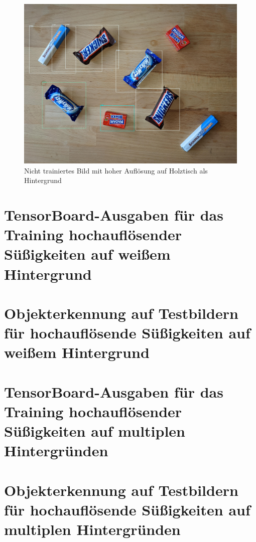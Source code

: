     \begin{figure}[H]
        \centering
        \includegraphics[angle = 90, width = \textwidth]{Bilder/models/model_comparison/ssd_resnet101_v1_fpn_640x640_coco17_tpu-8/HD_on_wood.jpg}
        \caption{Nicht trainiertes Bild mit hoher Auflösung auf Holztisch als Hintergrund}
    \end{figure}
    
    
    \section{TensorBoard-Ausgaben für das Training hochauflösender Süßigkeiten auf weißem Hintergrund}
    \label{app: TensorBoard-Ausgaben für das Training hochauflösender Süßigkeiten auf weißem Hintergrund}
    
    
    
    \section{Objekterkennung auf Testbildern für hochauflösende Süßigkeiten auf weißem Hintergrund}
    \label{app: Objekterkennung auf Testbildern für hochauflösende Süßigkeiten auf weißem Hintergrund}
    
    
    
    \section{TensorBoard-Ausgaben für das Training hochauflösender Süßigkeiten auf multiplen Hintergründen}
    \label{app: TensorBoard-Ausgaben für das Training hochauflösender Süßigkeiten auf multiplen Hintergründen}
    
    
    
    \section{Objekterkennung auf Testbildern für hochauflösende Süßigkeiten auf multiplen Hintergründen}
    \label{app: Objekterkennung auf Testbildern für hochauflösende Süßigkeiten auf multiplen Hintergründen}
    